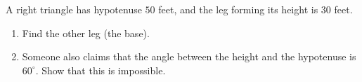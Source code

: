 A right triangle has hypotenuse $50$ feet, and the leg forming its height is $30$ feet.
\begin{enumerate}
\item[(a)] Find the other leg (the base).
\item[(b)] Someone also claims that the angle between the height and the hypotenuse is $60^\circ$. Show that this is impossible.
\end{enumerate}
